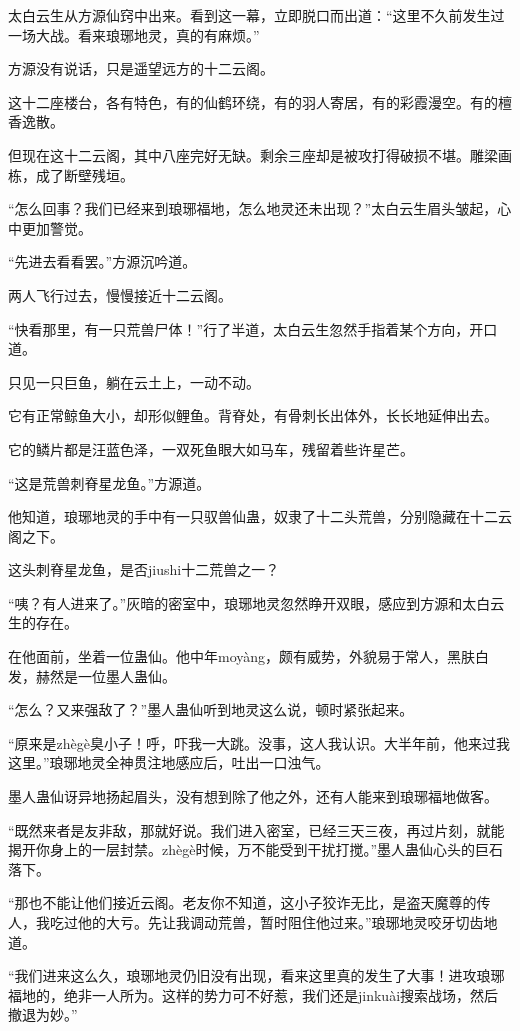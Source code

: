 \begin{this_body}
太白云生从方源仙窍中出来。看到这一幕，立即脱口而出道：“这里不久前发生过一场大战。看来琅琊地灵，真的有麻烦。”

方源没有说话，只是遥望远方的十二云阁。

这十二座楼台，各有特色，有的仙鹤环绕，有的羽人寄居，有的彩霞漫空。有的檀香逸散。

但现在这十二云阁，其中八座完好无缺。剩余三座却是被攻打得破损不堪。雕梁画栋，成了断壁残垣。

“怎么回事？我们已经来到琅琊福地，怎么地灵还未出现？”太白云生眉头皱起，心中更加警觉。

“先进去看看罢。”方源沉吟道。

两人飞行过去，慢慢接近十二云阁。

“快看那里，有一只荒兽尸体！”行了半道，太白云生忽然手指着某个方向，开口道。

只见一只巨鱼，躺在云土上，一动不动。

它有正常鲸鱼大小，却形似鲤鱼。背脊处，有骨刺长出体外，长长地延伸出去。

它的鳞片都是汪蓝色泽，一双死鱼眼大如马车，残留着些许星芒。

“这是荒兽刺脊星龙鱼。”方源道。

他知道，琅琊地灵的手中有一只驭兽仙蛊，奴隶了十二头荒兽，分别隐藏在十二云阁之下。

这头刺脊星龙鱼，是否jiushi十二荒兽之一？

“咦？有人进来了。”灰暗的密室中，琅琊地灵忽然睁开双眼，感应到方源和太白云生的存在。

在他面前，坐着一位蛊仙。他中年moyàng，颇有威势，外貌易于常人，黑肤白发，赫然是一位墨人蛊仙。

“怎么？又来强敌了？”墨人蛊仙听到地灵这么说，顿时紧张起来。

“原来是zhègè臭小子！呼，吓我一大跳。没事，这人我认识。大半年前，他来过我这里。”琅琊地灵全神贯注地感应后，吐出一口浊气。

墨人蛊仙讶异地扬起眉头，没有想到除了他之外，还有人能来到琅琊福地做客。

“既然来者是友非敌，那就好说。我们进入密室，已经三天三夜，再过片刻，就能揭开你身上的一层封禁。zhègè时候，万不能受到干扰打搅。”墨人蛊仙心头的巨石落下。

“那也不能让他们接近云阁。老友你不知道，这小子狡诈无比，是盗天魔尊的传人，我吃过他的大亏。先让我调动荒兽，暂时阻住他过来。”琅琊地灵咬牙切齿地道。

“我们进来这么久，琅琊地灵仍旧没有出现，看来这里真的发生了大事！进攻琅琊福地的，绝非一人所为。这样的势力可不好惹，我们还是jinkuài搜索战场，然后撤退为妙。”


\end{this_body}
